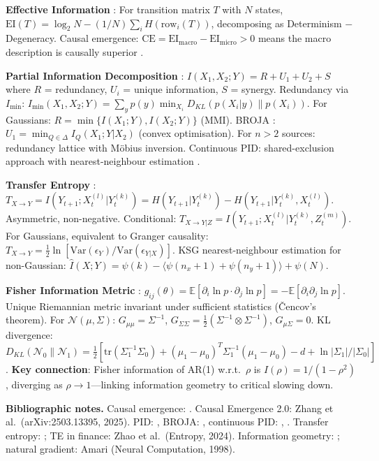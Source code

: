 \documentclass[11pt,a4paper]{article}
\theoremstyle{definition}
\newcommand{\E}{\mathbb{E}}
\newcommand{\Var}{\mathrm{Var}}
\newcommand{\tr}{\mathrm{tr}}
\begin{document}
\begin{appendices}
\textbf{Effective Information} \citep{hoel2013quantifying}: For transition matrix $T$ with $N$ states, $\mathrm{EI}(T) = \log_2 N - (1/N)\sum_i H(\mathrm{row}_i(T))$, decomposing as Determinism $-$ Degeneracy. Causal emergence: $\mathrm{CE} = \mathrm{EI}_{\mathrm{macro}} - \mathrm{EI}_{\mathrm{micro}} > 0$ means the macro description is causally superior \citep{hoel2017map}.

\textbf{Partial Information Decomposition} \citep{williams2010nonnegative}: $I(X_1,X_2;Y) = R + U_1 + U_2 + S$ where $R$ = redundancy, $U_i$ = unique information, $S$ = synergy. Redundancy via $I_{\min}$: $I_{\min}(X_1,X_2;Y) = \sum_y p(y)\min_{X_i} D_{KL}(p(X_i|y)\|p(X_i))$. For Gaussians: $R = \min\{I(X_1;Y), I(X_2;Y)\}$ (MMI). BROJA \citep{bertschinger2014quantifying}: $U_1 = \min_{Q \in \Delta} I_Q(X_1;Y|X_2)$ (convex optimisation). For $n > 2$ sources: redundancy lattice with M\"{o}bius inversion. Continuous PID: shared-exclusion approach with nearest-neighbour estimation \citep{ehrlich2024pid}.

\textbf{Transfer Entropy} \citep{schreiber2000measuring}: $T_{X \to Y} = I(Y_{t+1}; X_t^{(l)} | Y_t^{(k)}) = H(Y_{t+1}|Y_t^{(k)}) - H(Y_{t+1}|Y_t^{(k)}, X_t^{(l)})$. Asymmetric, non-negative. Conditional: $T_{X \to Y|Z} = I(Y_{t+1}; X_t^{(l)}|Y_t^{(k)}, Z_t^{(m)})$. For Gaussians, equivalent to Granger causality: $T_{X \to Y} = \frac{1}{2}\ln[\Var(\epsilon_Y)/\Var(\epsilon_{Y|X})]$. KSG nearest-neighbour estimation for non-Gaussian: $\hat{I}(X;Y) = \psi(k) - \langle\psi(n_x+1) + \psi(n_y+1)\rangle + \psi(N)$.

\textbf{Fisher Information Metric} \citep{amari2016information}: $g_{ij}(\theta) = \E[\partial_i \ln p \cdot \partial_j \ln p] = -\E[\partial_i\partial_j \ln p]$. Unique Riemannian metric invariant under sufficient statistics (\v{C}encov's theorem). For $\mathcal{N}(\mu,\Sigma)$: $G_{\mu\mu} = \Sigma^{-1}$, $G_{\Sigma\Sigma} = \frac{1}{2}(\Sigma^{-1} \otimes \Sigma^{-1})$, $G_{\mu\Sigma} = 0$. KL divergence: $D_{KL}(\mathcal{N}_0\|\mathcal{N}_1) = \frac{1}{2}[\tr(\Sigma_1^{-1}\Sigma_0) + (\mu_1-\mu_0)^T\Sigma_1^{-1}(\mu_1-\mu_0) - d + \ln|\Sigma_1|/|\Sigma_0|]$. \textbf{Key connection}: Fisher information of AR(1) w.r.t.\ $\rho$ is $I(\rho) = 1/(1-\rho^2)$, diverging as $\rho \to 1$---linking information geometry to critical slowing down.

\textbf{Bibliographic notes.} Causal emergence: \citet{hoel2013quantifying,hoel2017map,rosas2020reconciling}. Causal Emergence 2.0: Zhang et al.\ (arXiv:2503.13395, 2025). PID: \citet{williams2010nonnegative}, BROJA: \citet{bertschinger2014quantifying}, continuous PID: \citet{ehrlich2024pid}, \citet{lizier2018information}. Transfer entropy: \citet{schreiber2000measuring}; TE in finance: Zhao et al.\ (Entropy, 2024). Information geometry: \citet{amari2016information}; natural gradient: Amari (Neural Computation, 1998).



\end{appendices}
\end{document}
